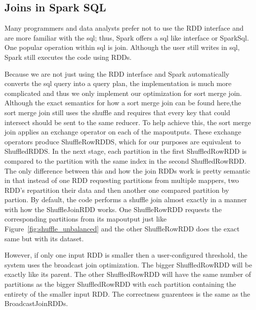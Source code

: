 \subsection{Joins in Spark SQL}

Many programmers and data analysts prefer not to use the RDD interface
and are more familiar with the sql; thus, Spark offers a sql like interface or SparkSql. One popular operation within sql is join.
Although the user still writes in sql, Spark still executes the code using RDDs.

Because we are not just using the RDD interface and Spark automatically converts the sql query into a query plan,
the implementation is much more complicated and thus we only implement our optimization for sort merge join.
Although the exact semantics for how a sort merge join can be found here,the sort merge join still uses the shuffle and requires that every
key that could intersect should be sent to the same reducer.
To help achieve this, the sort merge join applies an exchange operator on each of the mapoutputs. These exchange operators produce
ShuffleRowRDDS, which for our purposes are equivalent to ShuffledRDDS. In the next stage, each partition in the first ShuffledRowRDD is compared
to the partition with the same index in the second ShuffledRowRDD. The only difference between this and how the join RDDs work is pretty semantic
in  that instead of one RDD requesting partitions from multiple mappers, two RDD's repartition their data and then another one compared partition by partion.
By default, the code performs a shuffle join almost exactly in a manner with how the ShuffleJoinRDD works. One ShuffleRowRDD requests 
the corresponding partitions from its mapoutput just like Figure~\ref{fig:shuffle_unbalanced} and the other ShuffleRowRDD does the exact same but with its dataset.  

However, if only one input RDD is smaller then a user-configured threshold, the system uses the broadcast join optimization. The bigger ShuffledRowRDD will be exactly like its
parent. The other ShuffledRowRDD will have the same number of partitions as the bigger ShuffledRowRDD with each partition containing the entirety of the smaller input RDD. 
The correctness guarentees is the same as the BroadcastJoinRDDs.  

